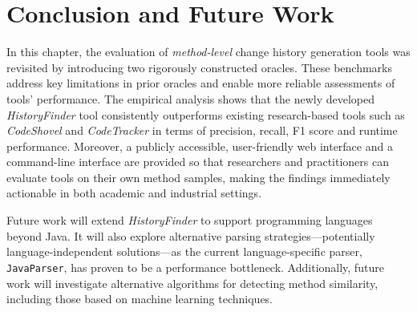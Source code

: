 \section{Conclusion and Future Work}
\label{sec:hf-conclusion}
In this chapter, the evaluation of \emph{method-level} change history generation tools was revisited by introducing two rigorously constructed oracles. These benchmarks address key limitations in prior oracles and enable more reliable assessments of tools' performance. The empirical analysis shows that the newly developed \textit{HistoryFinder} tool consistently outperforms existing research-based tools such as \textit{CodeShovel} and \textit{CodeTracker} in terms of precision, recall, F1 score and runtime performance. Moreover, a publicly accessible, user-friendly web interface and a command-line interface are provided so that researchers and practitioners can evaluate tools on their own method samples, making the findings immediately actionable in both academic and industrial settings.

Future work will extend \textit{HistoryFinder} to support programming languages beyond Java. It will also explore alternative parsing strategies—potentially language-independent solutions—as the current language-specific parser, \texttt{JavaParser}, has proven to be a performance bottleneck. Additionally, future work will investigate alternative algorithms for detecting method similarity, including those based on machine learning techniques.
